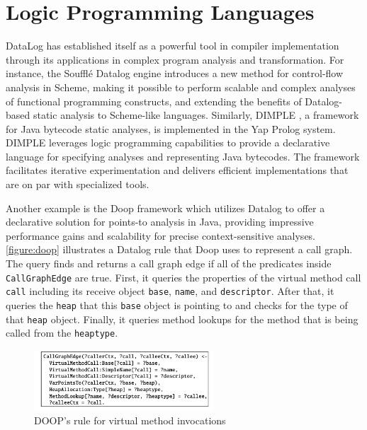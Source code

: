 \section{Logic Programming Languages}
DataLog has established itself as a powerful tool in compiler implementation through its applications in complex program analysis and transformation. 
For instance, the Soufflé Datalog engine \cite{silverman2021wantanalyzeschemeprograms} introduces a new method for control-flow analysis in Scheme, making it possible to perform scalable and complex analyses of functional programming constructs, and extending the benefits of Datalog-based static analysis to Scheme-like languages. Similarly, DIMPLE \cite{Benton2007}, a framework for Java bytecode static analyses, is implemented in the Yap Prolog system. DIMPLE leverages logic programming capabilities to provide a declarative language for specifying analyses and representing Java bytecodes. The framework facilitates iterative experimentation and delivers efficient implementations that are on par with specialized tools. 

Another example is the Doop framework \cite{Bravenboer2009} which utilizes Datalog to offer a declarative solution for points-to analysis in Java, providing impressive performance gains and scalability for precise context-sensitive analyses. \autoref{figure:doop} illustrates a Datalog rule that Doop uses to represent a call graph. The query finds and returns a call graph edge if all of the predicates inside \texttt{CallGraphEdge} are true. First, it queries the properties of the virtual method call \texttt{call} including its receive object \texttt{base}, \texttt{name}, and \texttt{descriptor}. After that, it queries the \texttt{heap} that this \texttt{base} object is pointing to and checks for the type of that \texttt{heap} object. Finally, it queries method lookups for the method that is being called from the \texttt{heaptype}.

\begin{figure}[h]
    \centering
    \includegraphics[width=0.6\textwidth]{Packages/Doop.png}
    \caption{DOOP's rule for virtual method invocations \cite{Bravenboer2009}}
    \label{figure:doop}
\end{figure}


